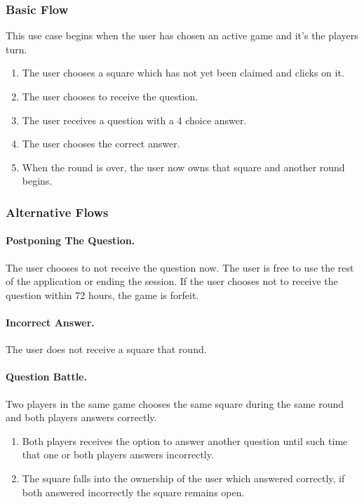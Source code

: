 \subsubsection{Basic Flow}
This use case begins when the user has chosen an active game and it's the players turn.
\begin{enumerate}
	\item The user chooses a square which has not yet been claimed and clicks on it.
	\item The user chooses to receive the question.
	\item The user receives a question with a 4 choice answer.
	\item The user chooses the correct answer.
	\item When the round is over, the user now owns that square and another round begins.
\end{enumerate}

\subsubsection{Alternative Flows}
\paragraph{Postponing The Question.}
The user chooses to not receive the question now.
The user is free to use the rest of the application or ending the session.
If the user chooses not to receive the question within 72 hours, the game is forfeit.

\paragraph{Incorrect Answer.}
The user does not receive a square that round.

\paragraph{Question Battle.}
Two players in the same game chooses the same square during the same round and both players answers correctly.
\begin{enumerate}
	\item Both players receives the option to answer another question until such time that one or both players answers incorrectly.
	\item The square falls into the ownership of the user which answered correctly, if both answered incorrectly the square remains open.
\end{enumerate}

